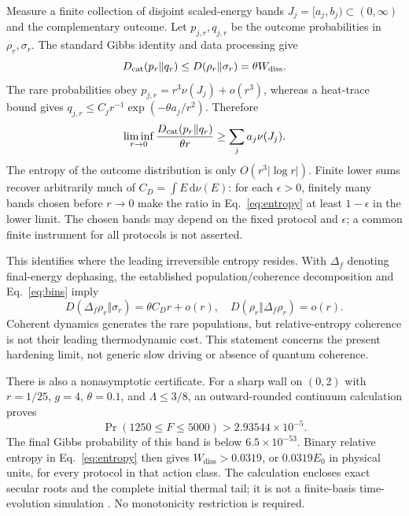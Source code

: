 \documentclass[aps,prl,reprint,superscriptaddress,longbibliography]{revtex4-2}
\newcommand{\Wd}{W_{\mathrm{diss}}}
\newcommand{\dd}{\mathrm{d}}
\begin{document}
Measure a finite collection of disjoint scaled-energy bands $J_j=[a_j,b_j)\subset(0,\infty)$ and the complementary outcome. Let $p_{j,r},q_{j,r}$ be the outcome probabilities in $\rho_r,\sigma_r$. The standard Gibbs identity and data processing give \cite{Deffner,Rubino}
\begin{equation}
 D_{\rm cat}(p_r\Vert q_r)\le D(\rho_r\Vert\sigma_r)=\theta\Wd.
 \label{eq:entropy}
\end{equation}
The rare probabilities obey $p_{j,r}=r^3\nu(J_j)+o(r^3)$, whereas a heat-trace bound gives $q_{j,r}\le C_jr^{-1}\exp(-\theta a_j/r^2)$. Therefore
\begin{equation}
 \liminf_{r\to0}\frac{D_{\rm cat}(p_r\Vert q_r)}{\theta r}
 \ge\sum_j a_j\nu(J_j).
 \label{eq:bins}
\end{equation}
The entropy of the outcome distribution is only $O(r^3|\log r|)$. Finite lower sums recover arbitrarily much of $C_D=\int E\,\dd\nu(E)$: for each $\epsilon>0$, finitely many bands chosen before $r\to0$ make the ratio in Eq.~\eqref{eq:entropy} at least $1-\epsilon$ in the lower limit. The chosen bands may depend on the fixed protocol and $\epsilon$; a common finite instrument for all protocols is not asserted.

This identifies where the leading irreversible entropy resides. With $\Delta_f$ denoting final-energy dephasing, the established population/coherence decomposition \cite{Francica} and Eq.~\eqref{eq:bins} imply
\begin{equation}
 D(\Delta_f\rho_r\Vert\sigma_r)=\theta C_Dr+o(r),\quad
 D(\rho_r\Vert\Delta_f\rho_r)=o(r).
 \label{eq:coherence}
\end{equation}
Coherent dynamics generates the rare populations, but relative-entropy coherence is not their leading thermodynamic cost. This statement concerns the present hardening limit, not generic slow driving or absence of quantum coherence.

There is also a nonasymptotic certificate. For a sharp wall on $(0,2)$ with $r=1/25$, $g=4$, $\theta=0.1$, and $\Lambda\le3/8$, an outward-rounded continuum calculation proves
\begin{equation}
 \Pr(1250\le F\le5000)>2.93544\times10^{-5}.
 \label{eq:finite}
\end{equation}
The final Gibbs probability of this band is below $6.5\times10^{-53}$. Binary relative entropy in Eq.~\eqref{eq:entropy} then gives $\Wd>0.0319$, or $0.0319E_0$ in physical units, for every protocol in that action class. The calculation encloses exact secular roots and the complete initial thermal tail; it is not a finite-basis time-evolution simulation \cite{SM}. No monotonicity restriction is required.
\end{document}
